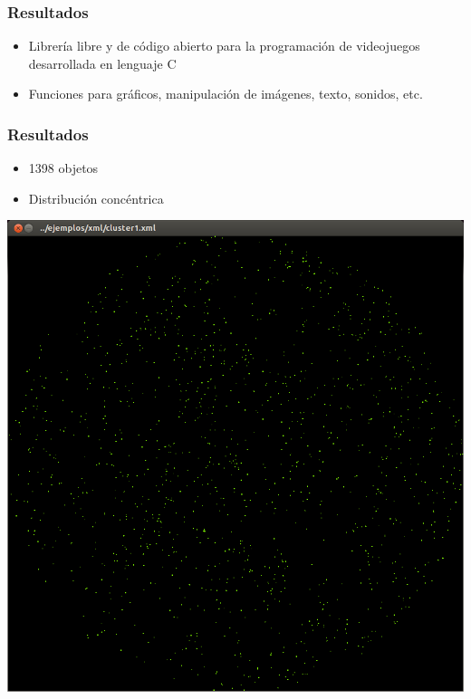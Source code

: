 
\begin{frame}
    \frametitle{Resultados}
		\begin{itemize}
		\item Librería libre y de código abierto para la programación de videojuegos desarrollada en lenguaje C
		\item Funciones para gráficos, manipulación de imágenes, texto, sonidos, etc.
		\end{itemize}
    \endblock{}
\end{frame}

\begin{frame}
    \frametitle{Resultados}
    \begin{itemize}
    \item 1398 objetos
    \item Distribución concéntrica
    \end{itemize}
    \endblock{}
		\begin{center}
    \includegraphics[height=0.55\textwidth]{FIGURES/cluster1-in}
		\end{center}
\end{frame}

